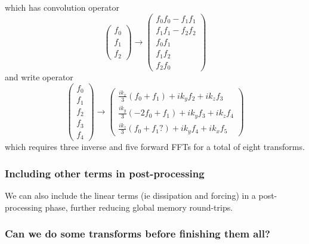 \documentclass[12pt]{article}
\renewcommand{\(}{\left(}
\renewcommand{\)}{\right)}
\begin{document}
which has convolution operator
\begin{dmath}
  \(
  \begin{matrix}
    f_0\\ f_1\\ f_2
  \end{matrix}
  \)
  \rightarrow
  \(
  \begin{matrix}
    f_0  f_0 - f_1 f_1 \\
    f_1  f_1 - f_2 f_2 \\
    f_0 f_1\\
    f_1 f_2\\
    f_2 f_0
  \end{matrix}
  \)
\end{dmath}
and write operator
\begin{dmath}
  \(
  \begin{matrix}
    f_0\\ f_1\\ f_2 \\ f_3 \\ f_4
  \end{matrix}
  \)
  \rightarrow
  \(
  \begin{matrix}
    \frac{ik_x}{3}\(f_0 + f_1 \) + ik_y f_2 + i k_z f_3\\
    \frac{ik_y}{3}\(-2f_0 + f_1 \) + ik_y f_3 + i k_z f_4\\
    \frac{ik_z}{3}\(f_0 + f_1 ? \) + ik_y f_4 + i k_x f_5
  \end{matrix}
  \)  
\end{dmath}
which requires three inverse and five forward FFTs for a total of
eight transforms.


\subsubsection{Including other terms in post-processing}

We can also include the linear terms (ie dissipation and forcing) in a
post-processing phase, further reducing global memory round-trips.

\subsubsection{Can we do some transforms before finishing them all?}
\end{document}

